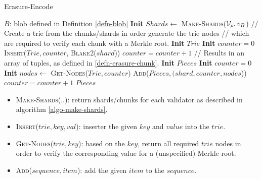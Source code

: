 \begin{algorithm}[H]
  \caption[]{\sc Erasure-Encode}
  \label{algo-erasure-encode}
  \begin{algorithmic}[1]
    \Require
    $\bar{B}$: blob defined in Definition \ref{defn-blob}
    \State \textbf{Init} $Shards \leftarrow$ \textsc{Make-Shards}($\mathcal{V}_\rho, v_B$)
    \Statex
    \Statex // Create a trie from the chunks/shards in order generate the trie nodes
    \Statex // which are required to verify each chunk with a Merkle root.
    \State \textbf{Init} $Trie$
    \State \textbf{Init} $counter = 0$
      \State \textsc{Insert}($Trie,counter$, \textsc{Blake2}($shard$))
      \State $counter = counter + 1$
    \EndFor
    \Statex
    \Statex // Results in an array of tuples, as defined in \ref{defn-erasure-chunk}.
    \State \textbf{Init} $Pieces$
    \State \textbf{Init} $counter = 0$
      \State \textbf{Init} $nodes \leftarrow$ \textsc{Get-Nodes}($Trie, counter$)
      \State \textsc{Add}($Pieces, (shard, counter, nodes$))
      \State $counter = counter + 1$
    \EndFor
    \Statex
    \Statex {}
    \State \Return $Pieces$
  \end{algorithmic}
\end{algorithm}

\begin{itemize}
  \item \textsc{Make-Shards(..)}: return shards/chunks for each validator as
  described in algorithm \ref{algo-make-shards}.
  \item \textsc{Insert($trie,key,val$)}: inserter the given $key$ and $value$ into the $trie$.
  \item \textsc{Get-Nodes($trie,key$)}: based on the $key$, return all required $trie$ nodes in
  order to verify the corresponding value for a (unspecified) Merkle root.
  \item \textsc{Add($sequence, item$)}: add the given $item$ to the $sequence$.
\end{itemize}

